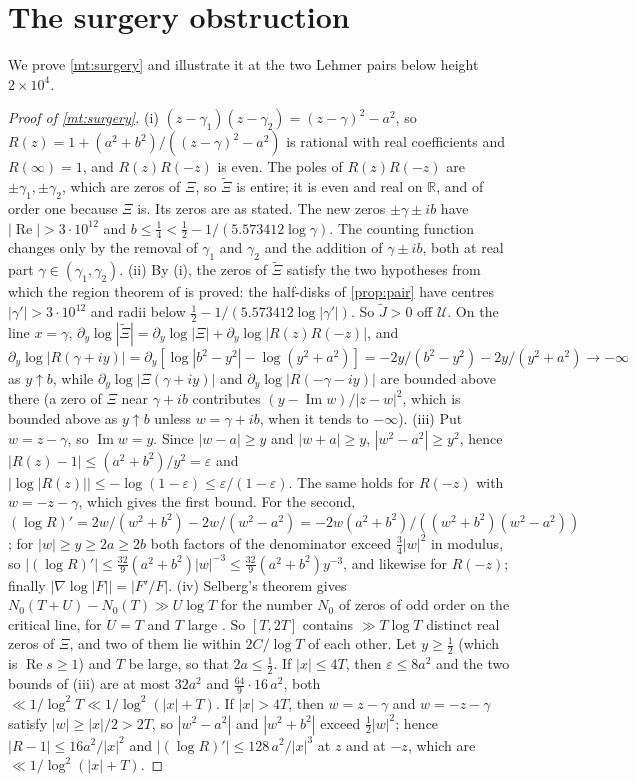 \documentclass[11pt]{article}
\theoremstyle{definition}\newtheorem{definition}[theorem]{Definition}
\theoremstyle{remark}\newtheorem{remark}[theorem]{Remark}
\newcommand{\R}{\mathbb R}\newcommand{\C}{\mathbb C}\newcommand{\N}{\mathbb N}
\renewcommand{\Re}{\operatorname{Re}}\renewcommand{\Im}{\operatorname{Im}}
\begin{document}
\section{The surgery obstruction}\label{sec:surgery}

We prove \cref{mt:surgery} and illustrate it at the two Lehmer pairs below height $2\times10^4$.

\begin{proof}[Proof of \cref{mt:surgery}]
(i) $(z-\gamma_1)(z-\gamma_2)=(z-\gamma)^2-a^2$, so $R(z)=1+(a^2+b^2)/((z-\gamma)^2-a^2)$ is rational with real coefficients and $R(\infty)=1$, and $R(z)R(-z)$ is even. The poles of $R(z)R(-z)$ are $\pm\gamma_1,\pm\gamma_2$, which are zeros of $\Xi$, so $\widetilde\Xi$ is entire; it is even and real on $\R$, and of order one because $\Xi$ is. Its zeros are as stated. The new zeros $\pm\gamma\pm ib$ have $|\Re|>3\cdot10^{12}$ and $b\le\frac14<\frac12-1/(5.573412\log\gamma)$. The counting function changes only by the removal of $\gamma_1$ and $\gamma_2$ and the addition of $\gamma\pm ib$, both at real part $\gamma\in(\gamma_1,\gamma_2)$.
(ii) By (i), the zeros of $\widetilde\Xi$ satisfy the two hypotheses from which the region theorem of \cite{S01} is proved: the half-disks of \cref{prop:pair} have centres $|\gamma'|>3\cdot10^{12}$ and radii below $\frac12-1/(5.573412\log|\gamma'|)$. So $\widetilde J>0$ off $\mathcal U$. On the line $x=\gamma$, $\partial_y\log|\widetilde\Xi|=\partial_y\log|\Xi|+\partial_y\log|R(z)R(-z)|$, and $\partial_y\log|R(\gamma+iy)|=\partial_y[\log|b^2-y^2|-\log(y^2+a^2)]=-2y/(b^2-y^2)-2y/(y^2+a^2)\to-\infty$ as $y\uparrow b$, while $\partial_y\log|\Xi(\gamma+iy)|$ and $\partial_y\log|R(-\gamma-iy)|$ are bounded above there (a zero of $\Xi$ near $\gamma+ib$ contributes $(y-\Im w)/|z-w|^2$, which is bounded above as $y\uparrow b$ unless $w=\gamma+ib$, when it tends to $-\infty$).
(iii) Put $w=z-\gamma$, so $\Im w=y$. Since $|w-a|\ge y$ and $|w+a|\ge y$, $|w^2-a^2|\ge y^2$, hence $|R(z)-1|\le(a^2+b^2)/y^2=\varepsilon$ and $|\log|R(z)||\le-\log(1-\varepsilon)\le\varepsilon/(1-\varepsilon)$. The same holds for $R(-z)$ with $w=-z-\gamma$, which gives the first bound. For the second, $(\log R)'=2w/(w^2+b^2)-2w/(w^2-a^2)=-2w(a^2+b^2)/((w^2+b^2)(w^2-a^2))$; for $|w|\ge y\ge2a\ge2b$ both factors of the denominator exceed $\frac34|w|^2$ in modulus, so $|(\log R)'|\le\frac{32}9(a^2+b^2)|w|^{-3}\le\frac{32}9(a^2+b^2)y^{-3}$, and likewise for $R(-z)$; finally $|\nabla\log|F||=|F'/F|$.
(iv) Selberg's theorem gives $N_0(T+U)-N_0(T)\gg U\log T$ for the number $N_0$ of zeros of odd order on the critical line, for $U=T$ and $T$ large \cite[Ch.~X]{Titchmarsh}. So $[T,2T]$ contains $\gg T\log T$ distinct real zeros of $\Xi$, and two of them lie within $2C/\log T$ of each other. Let $y\ge\frac12$ (which is $\Re s\ge1$) and $T$ be large, so that $2a\le\frac12$. If $|x|\le4T$, then $\varepsilon\le8a^2$ and the two bounds of (iii) are at most $32a^2$ and $\frac{64}9\cdot16\,a^2$, both $\ll1/\log^2T\ll1/\log^2(|x|+T)$. If $|x|>4T$, then $w=z-\gamma$ and $w=-z-\gamma$ satisfy $|w|\ge|x|/2>2T$, so $|w^2-a^2|$ and $|w^2+b^2|$ exceed $\frac12|w|^2$; hence $|R-1|\le16a^2/|x|^2$ and $|(\log R)'|\le128\,a^2/|x|^3$ at $z$ and at $-z$, which are $\ll1/\log^2(|x|+T)$.

\end{proof}
\end{document}
